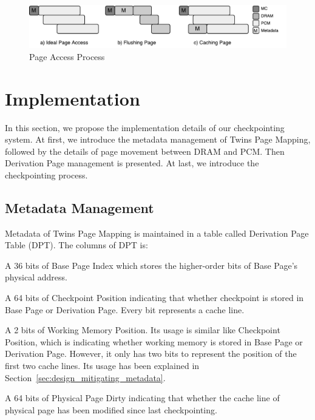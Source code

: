 \documentclass[conference]{IEEEtran}
\begin{document}
\begin{figure}
    \includegraphics[width=\columnwidth]{tag_access}
    \caption{Page Access Process}
\label{fig:tag_access}
\end{figure}

\section{Implementation}\label{sec:implementation}

In this section, we propose the implementation details of our checkpointing system.
At first, we introduce the metadata management of Twins Page Mapping, followed by the details of page movement between DRAM and PCM\@.
Then Derivation Page management is presented.
At last, we introduce the checkpointing process.

\subsection{Metadata Management}\label{sec:implementation_metadata}

Metadata of Twins Page Mapping is maintained in a table called Derivation Page Table (DPT).
The columns of DPT is:
\begin{enumerate*}
    \item A 36 bits of Base Page Index which stores the higher-order bits of Base Page's physical address.
    \item A 64 bits of Checkpoint Position indicating that whether checkpoint is stored in Base Page or Derivation Page.
        Every bit represents a cache line.
    \item A 2 bits of Working Memory Position.
        Its usage is similar like Checkpoint Position, which is indicating whether working memory is stored in Base Page or Derivation Page.
        However, it only has two bits to represent the position of the first two cache lines.
        Its usage has been explained in Section~\ref{sec:design_mitigating_metadata}.
    \item A 64 bits of Physical Page Dirty indicating that whether the cache line of physical page has been modified since last checkpointing.
\end{enumerate*}
\end{document}

